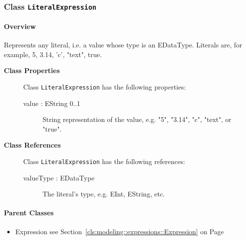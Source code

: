 \subsubsection{\Large{Class \bfseries \texttt{LiteralExpression}\normalfont}}
\label{cls:modeling::expressions::LiteralExpression} 
\paragraph{Overview}

	
			
Represents any literal, i.e. a value whose type is an EDataType. Literals are, for example, 5, 3.14, 'c', "text", true.	
		
	


\begin{description}

	\item[\textbf{Class Properties}] Class \texttt{LiteralExpression} has the following properties:
	\begin{description}
\item[value : EString 			0..1]
\hspace{\fill}
\nopagebreak


	
			
String representation of the value, e.g. "5", "3.14", "c", "text", or "true".	
		
	
	\end{description}
	
	\item[\textbf{Class References}] Class \texttt{LiteralExpression} has the following references:
	\begin{description}
\item[valueType : EDataType 	]
\hspace{\fill}
\nopagebreak


	
			
The literal's type, e.g. EInt, EString, etc.	
			
	
		
	
	\end{description}
	

\end{description}

\paragraph{Parent Classes}
\begin{itemize}
\item Expression see Section~\ref{cls:modeling::expressions::Expression} on Page~\pageref{cls:modeling::expressions::Expression}\end{itemize}
